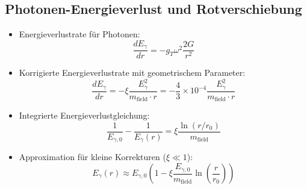 \documentclass[12pt,a4paper]{article}
\begin{document}
\subsection{Photonen-Energieverlust und Rotverschiebung}
\begin{itemize}
	\item Energieverlustrate für Photonen:
	\begin{equation}
		\frac{dE_\gamma}{dr} = -g_T \omega^2 \frac{2G}{r^2}
	\end{equation}
	
	\item Korrigierte Energieverlustrate mit geometrischem Parameter:
	\begin{equation}
		\boxed{\frac{dE_\gamma}{dr} = -\xi \frac{E_\gamma^2}{m_{\text{field}} \cdot r} = -\frac{4}{3} \times 10^{-4} \frac{E_\gamma^2}{m_{\text{field}} \cdot r}}
	\end{equation}
	
	\item Integrierte Energieverlustgleichung:
	\begin{equation}
		\frac{1}{E_{\gamma,0}} - \frac{1}{E_\gamma(r)} = \xi \frac{\ln(r/r_0)}{m_{\text{field}}}
	\end{equation}
	
	\item Approximation für kleine Korrekturen ($\xi \ll 1$):
	\begin{equation}
		E_\gamma(r) \approx E_{\gamma,0} \left(1 - \xi \frac{E_{\gamma,0}}{m_{\text{field}}} \ln\left(\frac{r}{r_0}\right)\right)
	\end{equation}
\end{itemize}
\end{document}
